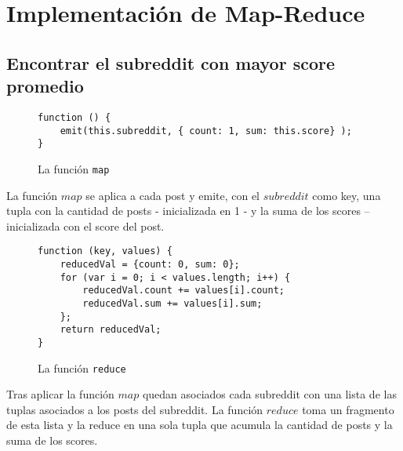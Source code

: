 \documentclass[11pt, a4paper, twoside]{article}
\begin{document}
\clearpage{\pagestyle{empty}}

\newpage


\clearpage{%
  \pagestyle{empty}\tableofcontents%
  \vspace{3cm}%
  \clearpage%
}
\setcounter{page}{1}

\section{Implementación de Map-Reduce}

\subsection{Encontrar el subreddit con mayor score promedio}


\begin{figure}[H]
  \caption{La función \texttt{map}}
  \centering
\begin{verbatim}
function () {
    emit(this.subreddit, { count: 1, sum: this.score} );
}
\end{verbatim}

\end{figure}

La función $map$ se aplica a cada post y emite, con el $subreddit$ como key, una tupla con la cantidad de posts - inicializada en 1 - y la suma de los scores -- inicializada con el score del post.

\begin{figure}[H]
\caption{La función \texttt{reduce}}
\centering
\begin{verbatim}
function (key, values) {
    reducedVal = {count: 0, sum: 0};
    for (var i = 0; i < values.length; i++) {
        reducedVal.count += values[i].count;
        reducedVal.sum += values[i].sum;
    };
    return reducedVal;
}
\end{verbatim}
\end{figure}

Tras aplicar la función $map$ quedan asociados cada subreddit con una lista de las tuplas asociados a los posts del subreddit. La función $reduce$ toma un fragmento de esta lista y la reduce en una sola tupla que acumula la cantidad de posts y la suma de los scores.
\end{document}
